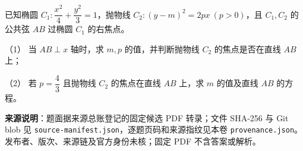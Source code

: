 \begin{question}
已知椭圆 $C_1:\dfrac{x^2}{4}+\dfrac{y^2}{3}=1$，抛物线 $C_2:(y-m)^2=2px\ (p>0)$，且 $C_1,C_2$ 的公共弦 $AB$ 过椭圆 $C_1$ 的右焦点。

（1） 当 $AB\perp x$ 轴时，求 $m,p$ 的值，并判断抛物线 $C_2$ 的焦点是否在直线 $AB$ 上；

（2） 若 $p=\dfrac43$ 且抛物线 $C_2$ 的焦点在直线 $AB$ 上，求 $m$ 的值及直线 $AB$ 的方程。

\par\medskip

\begin{gktip}
\textbf{来源说明}：题面据来源总账登记的固定候选 PDF 转录；文件 SHA-256 与 Git blob 见 \texttt{source-manifest.json}，逐题页码和来源指纹见本卷 \texttt{provenance.json}。发布者、版次、来源链及官方身份未核；固定 PDF 不含答案或解析。
\end{gktip}

\end{question}